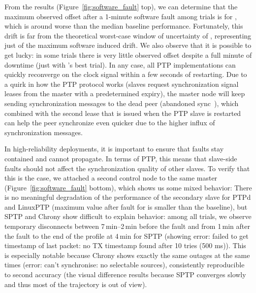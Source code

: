 
From the results (Figure~\ref{fig:software_fault} top), we can determine that the maximum observed offset after a 1-minute software fault among \fNum{\bSoftwareFaultNumProfiles} trials is \fTime{\cmpMax} for \fVendor{\cmpMaxArg}, which is around  worse than the median baseline performance. Fortunately, this drift is far from the theoretical worst-case window of uncertainty of \fTimeMS{\windowOfUncertaintyOneMinute}, representing just \fPercentage[1]{\cmpMax/\windowOfUncertaintyOneMinute} of the maximum software induced drift. We also observe that it is possible to get lucky: in some trials there is very little observed offset despite a full minute of downtime ({just \fTime{\cmpMin} with \fVendor{\cmpMinArg}}'s best trial). In any case, all PTP implementations can quickly reconverge on the clock signal within a few seconds of restarting. Due to a quirk in how the PTP protocol works (slaves request synchronization signal leases from the master with a predetermined expiry), the master node will keep sending synchronization messages to the dead peer (abandoned sync~\cite{sptp}), which combined with the second lease that is issued when the PTP slave is restarted can help the peer synchronize even quicker due to the higher influx of synchronization messages.


In high-reliability deployments, it is important to ensure that faults stay contained and cannot propagate. In terms of PTP, this means that slave-side faults should not affect the synchronization quality of other slaves. To verify that this is the case, we attached a second control node to the same master (Figure~\ref{fig:software_fault} bottom), which shows us some mixed behavior: There is no meaningful degradation of the performance of the secondary slave for PTPd and LinuxPTP (maximum value after fault \fTime[0]{\cmpMax} for \fVendor{\cmpMaxArg} is smaller than the baseline), but SPTP and Chrony show difficult to explain behavior: among all trials, we observe temporary disconnects between 7\,min--2\,min before the fault and from 1\,min after the fault to the end of the profile at 4\,min for SPTP (showing error: failed to get timestamp of last packet: no TX timestamp found after 10 tries (500 ms)). This is especially notable because Chrony shows exactly the same outages at the same times (error: can't synchronise: no selectable sources), consistently reproducible to second accuracy (the visual difference results because SPTP converges slowly and thus most of the trajectory is out of view).

